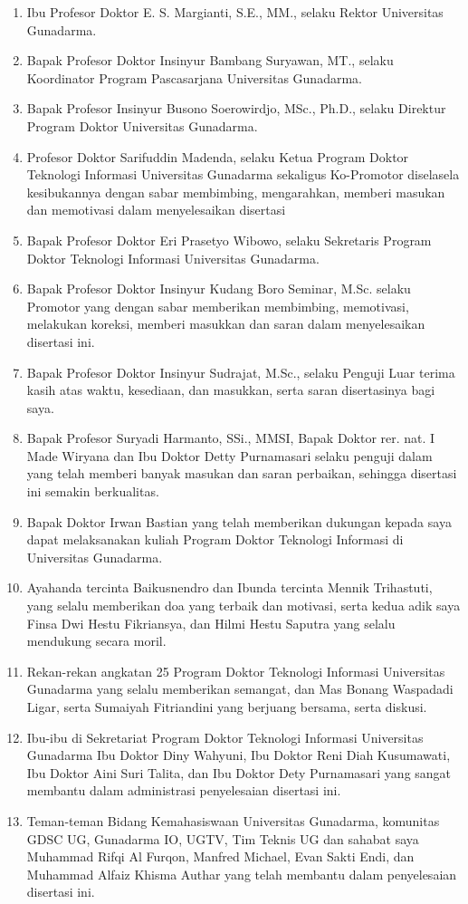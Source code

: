 \begin{enumerate}
\item Ibu Profesor Doktor E. S. Margianti, S.E., MM., selaku Rektor Universitas Gunadarma.
\item Bapak Profesor Doktor Insinyur Bambang Suryawan, MT., selaku Koordinator Program Pascasarjana Universitas Gunadarma.
\item Bapak Profesor Insinyur Busono Soerowirdjo, MSc., Ph.D., selaku Direktur Program Doktor Universitas Gunadarma.
\item Profesor Doktor Sarifuddin Madenda, selaku Ketua Program Doktor Teknologi Informasi Universitas Gunadarma sekaligus Ko-Promotor diselasela kesibukannya dengan sabar membimbing, mengarahkan, memberi masukan dan memotivasi dalam menyelesaikan disertasi
\item Bapak Profesor Doktor Eri Prasetyo Wibowo, selaku Sekretaris Program Doktor Teknologi Informasi Universitas Gunadarma.
\item Bapak Profesor Doktor Insinyur Kudang Boro Seminar, M.Sc. selaku Promotor yang dengan sabar memberikan membimbing, memotivasi, melakukan koreksi, memberi masukkan dan saran dalam menyelesaikan disertasi ini.
\item Bapak Profesor Doktor Insinyur Sudrajat, M.Sc., selaku Penguji Luar terima kasih atas waktu, kesediaan, dan masukkan, serta saran disertasinya bagi saya.
\item Bapak Profesor Suryadi Harmanto, SSi., MMSI, Bapak Doktor rer. nat. I Made Wiryana dan Ibu Doktor Detty Purnamasari selaku penguji dalam yang telah memberi banyak masukan dan saran perbaikan, sehingga disertasi ini semakin berkualitas.
\item Bapak Doktor Irwan Bastian yang telah memberikan dukungan kepada saya dapat melaksanakan kuliah Program Doktor Teknologi Informasi di Universitas Gunadarma.
\item Ayahanda tercinta Baikusnendro dan Ibunda tercinta Mennik Trihastuti, yang selalu memberikan doa yang terbaik dan motivasi, serta kedua adik saya Finsa Dwi Hestu Fikriansya, dan Hilmi Hestu Saputra yang selalu mendukung secara moril.
\item Rekan-rekan angkatan 25 Program Doktor Teknologi Informasi Universitas
Gunadarma yang selalu memberikan semangat, dan Mas Bonang Waspadadi Ligar, serta Sumaiyah Fitriandini yang berjuang bersama, serta diskusi.
\item Ibu-ibu di Sekretariat Program Doktor Teknologi Informasi Universitas Gunadarma Ibu Doktor Diny Wahyuni, Ibu Doktor Reni Diah Kusumawati, Ibu Doktor Aini Suri Talita, dan Ibu Doktor Dety Purnamasari yang sangat membantu dalam administrasi penyelesaian disertasi ini.
\item Teman-teman Bidang Kemahasiswaan Universitas Gunadarma, komunitas GDSC UG, Gunadarma IO, UGTV, Tim Teknis UG dan sahabat saya Muhammad Rifqi Al Furqon, Manfred Michael, Evan Sakti Endi, dan Muhammad Alfaiz Khisma Authar yang telah membantu dalam penyelesaian disertasi ini.
\end{enumerate}


